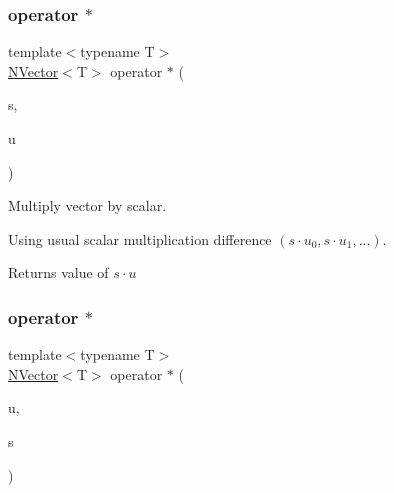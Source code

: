 \subsubsection{\texorpdfstring{operator $\ast$}{operator *}\hspace{0.1cm}{\footnotesize\ttfamily [1/2]}}
{\footnotesize\ttfamily template$<$typename T$>$ \\
\mbox{\hyperlink{class_n_vector}{N\+Vector}}$<$T$>$ operator $\ast$ (\begin{DoxyParamCaption}\item[{T}]{s,  }\item[{\mbox{\hyperlink{class_n_vector}{N\+Vector}}$<$ T $>$}]{u }\end{DoxyParamCaption})\hspace{0.3cm}{\ttfamily [friend]}}



Multiply vector by scalar. 

Using usual scalar multiplication difference $ (s \cdot u_0, s \cdot u_1, ...) $. \begin{DoxyReturn}{Returns}
value of $ s \cdot u $ 
\end{DoxyReturn}
\mbox{\label{class_n_vector_ab1ec596666b587300410f8fa459f295d}} 
\subsubsection{\texorpdfstring{operator $\ast$}{operator *}\hspace{0.1cm}{\footnotesize\ttfamily [2/2]}}
{\footnotesize\ttfamily template$<$typename T$>$ \\
\mbox{\hyperlink{class_n_vector}{N\+Vector}}$<$T$>$ operator $\ast$ (\begin{DoxyParamCaption}\item[{const \mbox{\hyperlink{class_n_vector}{N\+Vector}}$<$ T $>$ \&}]{u,  }\item[{T}]{s }\end{DoxyParamCaption})\hspace{0.3cm}{\ttfamily [friend]}}

\mbox{\label{class_n_vector_a56643335b5a0b0b07abe89e2cac8a5de}} 
